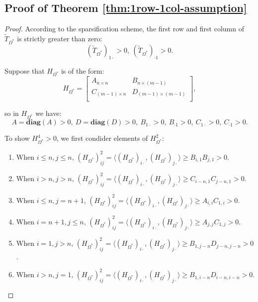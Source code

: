 \documentclass{article}
\theoremstyle{plain}
\theoremstyle{definition}
\theoremstyle{remark}
\begin{document}
\subsection{Proof of Theorem \ref{thm:1row-1col-assumption}}
\begin{proof}
According to the sparsification scheme, the first row and first column of $\tilde{T}_{\Omega^*}$ is strictly greater than zero:
\[
(\tilde{T}_{\Omega^*})_{1\cdot} > 0,\ 
(\tilde{T}_{\Omega^*})_{\cdot 1} > 0.
\]

Suppose that $H_{\Omega^*}$ is of the form:
\[
H_{\Omega^*} = \begin{bmatrix}
    A_{n \times n} & B_{n \times (m - 1)} \\
    C_{(m - 1) \times n} & D_{(m - 1) \times (m - 1)} \\
\end{bmatrix},
\]

so in $H_{\Omega^*}$ we have:
\[
A=\mathbf{diag}(A) > 0,\ D=\mathbf{diag}(D) > 0,\ B_{1 \cdot} > 0,\ B_{\cdot 1} > 0,\ C_{1 \cdot} > 0,\ C_{\cdot 1} > 0.
\]

To show $H_{\Omega^*}^4 > 0$, we first condider elements of $H_{\Omega^*}^2$:
\begin{enumerate}[label=\roman*.]
    \item {
        When $i \leq n, j \leq n$, $(H_{\Omega^*})^2_{ij} = \langle (H_{\Omega^*})_{i \cdot}, (H_{\Omega^*})_{j \cdot} \rangle \geq B_{i, 1} B_{j, 1} > 0$.
    }
    \item {
        When $i > n, j > n$, $(H_{\Omega^*})^2_{ij} = \langle (H_{\Omega^*})_{i \cdot}, (H_{\Omega^*})_{j \cdot} \rangle \geq C_{i - n, 1} C_{j - n, 1} > 0$.
    }
    \item {
        When $i \leq n, j = n + 1$, $(H_{\Omega^*})^2_{ij} = \langle (H_{\Omega^*})_{i \cdot}, (H_{\Omega^*})_{j \cdot} \rangle \geq A_{i, i} C_{1, i} > 0$.
    }
    \item {
        When $i = n + 1, j \leq n$, $(H_{\Omega^*})^2_{ij} = \langle (H_{\Omega^*})_{i \cdot}, (H_{\Omega^*})_{j \cdot} \rangle \geq A_{j, j} C_{1, j} > 0$.
    }
    \item {
        When $i = 1, j > n$, $(H_{\Omega^*})^2_{ij} = \langle (H_{\Omega^*})_{i \cdot}, (H_{\Omega^*})_{j \cdot} \rangle \geq B_{1, j - n} D_{j-n, j-n} > 0$.
    }
    \item {
        When $i > n, j = 1$, $(H_{\Omega^*})^2_{ij} = \langle (H_{\Omega^*})_{i \cdot}, (H_{\Omega^*})_{j \cdot} \rangle \geq B_{1, i - n} D_{i-n, i-n} > 0$.
    }
\end{enumerate}


\end{proof}
\end{document}
